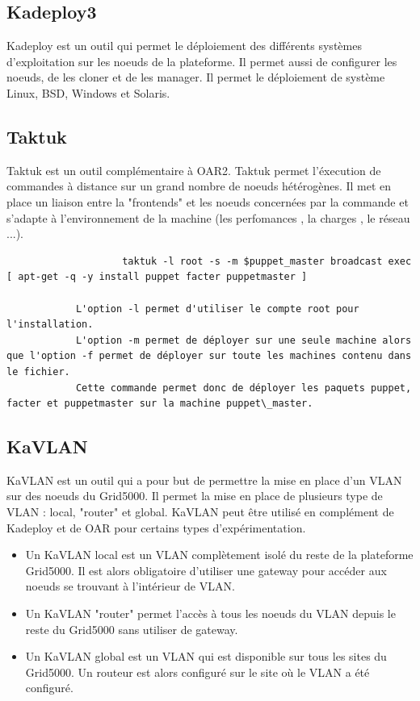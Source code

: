 \documentclass [10pt,a4paper]{report}
\begin{document}
		\subsection{Kadeploy3}
			Kadeploy est un outil qui permet le déploiement des différents systèmes d'exploitation sur les noeuds de la plateforme. Il permet aussi de configurer les noeuds, de les cloner et de les manager. Il permet le déploiement de système Linux, BSD, Windows et Solaris.
		\subsection{Taktuk}
			Taktuk est un outil complémentaire à OAR2. Taktuk permet l'éxecution de commandes à distance sur un grand nombre de noeuds hétérogènes. Il met en place un liaison entre la "frontends" et les noeuds concernées par la commande et s'adapte  à l'environnement de la machine (les perfomances , la charges , le réseau ...). 
			\begin{lstlisting}
					taktuk -l root -s -m $puppet_master broadcast exec [ apt-get -q -y install puppet facter puppetmaster ]
			
			L'option -l permet d'utiliser le compte root pour l'installation.
			L'option -m permet de déployer sur une seule machine alors que l'option -f permet de déployer sur toute les machines contenu dans le fichier.
			Cette commande permet donc de déployer les paquets puppet, facter et puppetmaster sur la machine puppet\_master.
			\end{lstlisting}
		\subsection{KaVLAN}
			KaVLAN est un outil qui a pour but de permettre la mise en place d'un VLAN sur des noeuds du Grid5000. Il permet la mise en place de plusieurs type de VLAN : local, "router" et global. KaVLAN peut être utilisé en complément de Kadeploy et de OAR pour certains types d'expérimentation.\\
			\begin{itemize}
  				\item Un KaVLAN local est un VLAN complètement isolé du reste de la plateforme Grid5000. Il est alors obligatoire d'utiliser une gateway pour accéder aux noeuds se trouvant à l'intérieur de VLAN.
  				\item Un KaVLAN "router" permet l'accès à tous les noeuds du VLAN depuis le reste du Grid5000 sans utiliser de gateway.
 				 \item Un KaVLAN global est un VLAN qui est disponible sur tous les sites du Grid5000. Un routeur est alors configuré sur le site où le VLAN a été configuré.
			\end{itemize}
			
\end{document}
